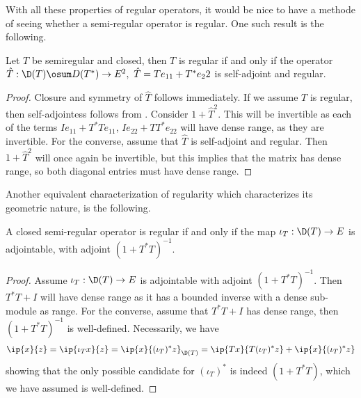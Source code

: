 With all these properties of regular operators, it would be nice to have a methode of seeing whether a semi-regular operator is regular. One such result is the following.
\begin{lemma}
	Let $T$ be semiregular and closed, then $T$ is regular if and only if the operator $\hat{T}:\D(T)\osum D(T^*)\to E^2,~\hat{T}=Te_{11}+T^*e_{2}2$ is self-adjoint and regular. 
\end{lemma}
\begin{proof}
	Closure and symmetry of $\hat{T}$ follows immediately. If we assume $T$ is regular, then self-adjointess follows from . Consider $1+\hat{T}^2$. This will be invertible as each of the terms $Ie_11+T^*Te_11$, $Ie_22+TT^*e_22$ will have dense range, as they are invertible. 
	For the converse, assume that $\hat{T}$ is self-adjoint and regular. Then $1+\hat{T}^2$ will once again be invertible, but this implies that the matrix has dense range, so both diagonal entries must have dense range. 
\end{proof}
Another equivalent characterization of regularity which characterizes its geometric nature, is the following. 
\begin{proposition}
	A closed semi-regular operator is regular if and only if the map $\iota_T :\D(T)\to E$ is adjointable, with adjoint $(1+T^*T)^{-1}$. 
\end{proposition}
\begin{proof}
	Assume $\iota_T:\D(T)\to E$ is adjointable with adjoint $(1+T^*T)^{-1}$. Then $T^*T+I$ will have dense range as it has a bounded inverse with a dense sub-module as range. 
	For the converse, assume that $T^*T+I$ has dense range, then $(1+T^*T)^{-1}$ is well-defined. Necessarily, we have 
	\begin{align*}
		\ip{x}{z}=\ip{\iota_T x}{z}=\ip{x}{(\iota_T)^*z}_{\D(T)}=\ip{Tx}{T(\iota_T)^*z}+\ip{x}{(\iota_T)^*z}
	\end{align*}
	showing that the only possible candidate for $(\iota_T)^*$ is indeed $(1+T^*T)$, which we have assumed is well-defined.
\end{proof}




